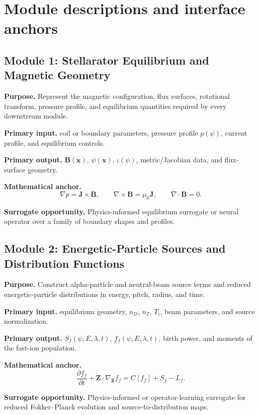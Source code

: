 \documentclass[11pt]{article}
\begin{document}
\section{Module descriptions and interface anchors}
\subsection{Module 1: Stellarator Equilibrium and Magnetic Geometry}
\textbf{Purpose.} Represent the magnetic configuration, flux surfaces, rotational transform, pressure profile, and equilibrium quantities required by every downstream module.

\textbf{Primary input.} coil or boundary parameters, pressure profile $p(\psi)$, current profile, and equilibrium controls.

\textbf{Primary output.} $\mathbf B(\mathbf x)$, $\psi(\mathbf x)$, $\iota(\psi)$, metric/Jacobian data, and flux-surface geometry.

\textbf{Mathematical anchor.}
\begin{equation}
\nabla p = \mathbf J\times\mathbf B,\qquad \nabla\times\mathbf B=\mu_0\mathbf J,\qquad \nabla\cdot\mathbf B=0.
\end{equation}

\textbf{Surrogate opportunity.} Physics-informed equilibrium surrogate or neural operator over a family of boundary shapes and profiles.


\subsection{Module 2: Energetic-Particle Sources and Distribution Functions}
\textbf{Purpose.} Construct alpha-particle and neutral-beam source terms and reduced energetic-particle distributions in energy, pitch, radius, and time.

\textbf{Primary input.} equilibrium geometry, $n_D$, $n_T$, $T_i$, beam parameters, and source normalization.

\textbf{Primary output.} $S_f(\psi,E,\lambda,t)$, $f_f(\psi,E,\lambda,t)$, birth power, and moments of the fast-ion population.

\textbf{Mathematical anchor.}
\begin{equation}
\frac{\partial f_f}{\partial t}+\dot{\mathbf Z}\cdot\nabla_{\mathbf Z}f_f=C[f_f]+S_f-L_f.
\end{equation}

\textbf{Surrogate opportunity.} Physics-informed or operator-learning surrogate for reduced Fokker--Planck evolution and source-to-distribution maps.
\end{document}
